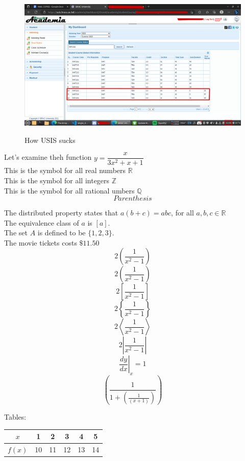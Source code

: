 \documentclass[12pt, a4paper]{article}
\def\eq1{y = \dfrac{x}{3x^2+x+1}}
\begin{document}
\begin{figure}
\begin{center}
\includegraphics[scale=.25]{meaw.png}\\[6pt]
\caption{How USIS sucks}
\end{center}
\end{figure}

Let's examine theh function $\eq1$ \\[6pt]
This is the symbol for all real numbers $\mathbb{R}$ \\[6pt]
This is the symbol for all integers $\mathbb{Z}$ \\[6pt]
This is the symbol for all rational umbers $\mathbb{Q}$\\[6pt]
$$Parenthesis$$

The distributed property states that $a(b+c) = abc$, for all $a,b,c \in\mathbb{R}$\\[6pt]
The equivalence class of $a$ is $[a]$.\\[6pt]
The set $A$ is defined to be $\{1, 2, 3\}$.\\[6pt]
The movie tickets costs $\$11.50$
$$ 2(\frac{1}{x^2 - 1})$$
$$ 2\left(\dfrac{1}{x^2 - 1}\right)$$
$$ 2\left[\dfrac{1}{x^2 - 1}\right]$$
$$ 2\left\{\dfrac{1}{x^2 - 1}\right\}$$
$$ 2\left\langle \dfrac{1}{x^2 - 1}\right\rangle$$
$$ 2\left|\dfrac{1}{x^2 - 1}\right|$$
$$\left.\frac{dy}{dx}\right|_x=1$$
$$\left(\frac{1}{1+\left(\frac{1}{(x+1)}\right)}\right)$$


Tables: \\

\begin{tabular}{|c||c|c|c|c|c|}
\hline
$x$&1&2&3&4&5\\\hline
$f(x)$&10&11&12&13&14\\\hline

\end{tabular}\\
\vspace{1cm}
\end{document}

